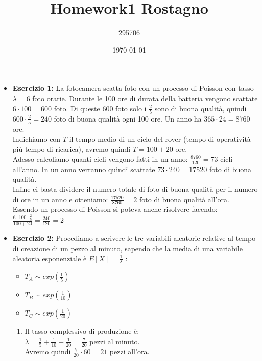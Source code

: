 \documentclass[a4paper,12pt]{article}
\begin{document}
	\title{\textbf{Homework1 Rostagno}}
	\author{295706}
	\date{\today}
	\maketitle
	
	\begin{itemize}
		\item \textbf{Esercizio 1: }La fotocamera scatta foto con un processo di Poisson con tasso $\lambda=6$ foto orarie. Durante le 100 ore di durata della batteria vengono scattate $6\cdot{100}=600$ foto. Di queste 600 foto solo i $\frac{2}{5}$ sono di buona qualità, quindi $600\cdot{\frac{2}{5}}=240$ foto di buona qualità ogni 100 ore. Un anno ha $365\cdot{24}=8760$ ore.\\
		Indichiamo con $T$ il tempo medio di un ciclo del rover (tempo di operatività più tempo di ricarica), avremo quindi $T=100+20$ ore.\\
		Adesso calcoliamo quanti cicli vengono fatti in un anno: $\frac{8760}{120}=73$ cicli all'anno. In un anno verranno quindi scattate $73\cdot{240}=17520$ foto di buona qualità.\\
		Infine ci basta dividere il numero totale di foto di buona qualità per il numero di ore in un anno e otteniamo: $\frac{17520}{8760}=2$ foto di buona qualità all'ora.\\
		Essendo un processo di Poisson si poteva anche risolvere facendo:\\ $\frac{6\cdot100\cdot\frac{2}{5}}{100+20}=\frac{240}{120}=2$
		\item \textbf{Esercizio 2: }Procediamo a scrivere le tre variabili aleatorie relative al tempo di creazione di un pezzo al minuto, sapendo che la media di una variabile aleatoria esponenziale è $E[X]=\frac{1}{\lambda}$ :\\
		\begin{itemize}
			\item $T_A\sim exp(\frac{1}{5})$
			\item $T_B\sim exp(\frac{1}{10})$
			\item $T_C\sim exp(\frac{1}{20})$
		\end{itemize}
		\begin{enumerate}[label=\alph*)]
			\item Il tasso complessivo di produzione è:\\
			$\lambda=\frac{1}{5}+\frac{1}{10}+\frac{1}{20}=\frac{7}{20}$ pezzi al minuto.\\
			Avremo quindi $\frac{7}{20} \cdot 60=21$ pezzi all'ora.\\

\end{enumerate}
\end{itemize}
\end{document}
